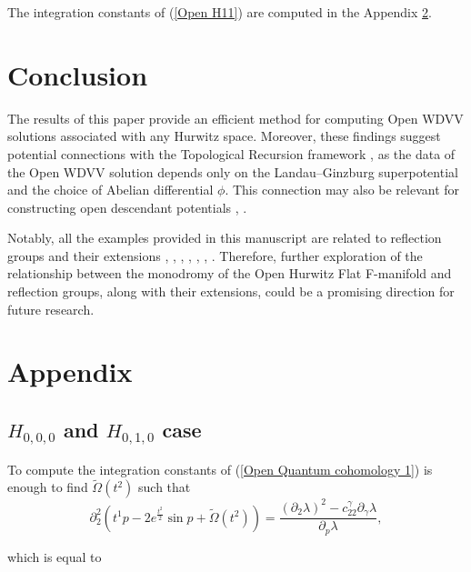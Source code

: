 \documentclass{article}
\theoremstyle{definition}
\begin{document}
The integration constants of (\ref{Open H11})  are computed in the Appendix \ref{Appendix}. 

\section{Conclusion}

The results of this paper provide an efficient method for computing Open WDVV solutions associated with any Hurwitz space. Moreover, these findings suggest potential connections with the Topological Recursion framework \cite{Eynard}, as the data of the Open WDVV solution depends only on the Landau–Ginzburg superpotential and the choice of Abelian differential $\phi$. This connection may also be relevant for constructing open descendant potentials \cite{Alexander}, \cite{Buryak}.

Notably, all the examples provided in this manuscript are related to reflection groups and their extensions \cite{Almeida 1}, \cite{Almeida 2}, \cite{Bertola}, \cite{Bertola 2}, \cite{B. Dubrovin1}, \cite{B. Dubrovin34}, \cite{Zuo}. Therefore, further exploration of the relationship between the monodromy of the Open Hurwitz Flat F-manifold and reflection groups, along with their extensions, could be a promising direction for future research.


\section{Appendix}\label{Appendix}


\subsection{$H_{0,0,0}$ and $H_{0,1,0}$ case }

To compute the integration constants of (\ref{Open Quantum cohomology 1}) is enough to find  $\tilde\Omega(t^2) $ such that 
 \begin{equation*}
\partial^2_{2}\left(t^1p-2e^{\frac{t^2}{2}}\sin p+\tilde\Omega(t^2)   \right)= \frac{ (\partial_2\lambda)^2 -c_{22}^{\gamma}\partial_{\gamma}\lambda}{ \partial_{p}\lambda},
\end{equation*}



which is equal to 

\end{document}
